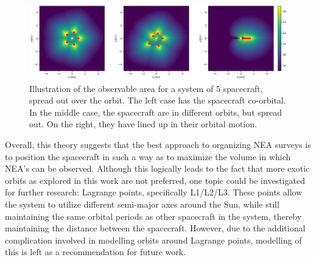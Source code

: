 \begin{figure}[htbp]
 \centering
 \includegraphics[width=1.0\textwidth]{img/coverage_free.png}
 \caption{Illustration of the observable area for a system of 5 spacecraft, spread out over the orbit. The left case has the spacecraft co-orbital. In the middle case, the spacecraft are in different orbits, but spread out. On the right, they have lined up in their orbital motion.}
 \label{fig:coverage_free}
\end{figure}

Overall, this theory suggests that the best approach to organizing NEA surveys is to position the spacecraft in such a way as to maximize the volume in which NEA's can be observed. Although this logically leads to the fact that more exotic orbits as explored in this work are not preferred, one topic could be investigated for further research: Lagrange points, specifically L1/L2/L3. These points allow the system to utilize different semi-major axes around the Sun, while still maintaining the same orbital periods as other spacecraft in the system, thereby maintaining the distance between the spacecraft. However, due to the additional complication involved in modelling orbits around Lagrange points, modelling of this is left as a recommendation for future work.


